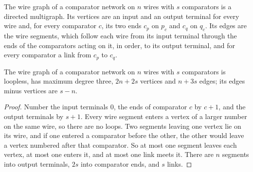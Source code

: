 \begin{definition}
  \label{def:lowerbounds-algebraic-halver-wire-graph}
  \leanok
  The wire graph of a comparator network on $n$ wires with $s$ comparators is a directed
  multigraph. Its vertices are an input and an output terminal for every wire and, for every
  comparator $c$, its two ends $c_p$ on $p_c$ and $c_q$ on $q_c$. Its edges are the wire
  segments, which follow each wire from its input terminal through the ends of the comparators
  acting on it, in order, to its output terminal, and for every comparator a link from $c_p$ to
  $c_q$.
\end{definition}

\begin{lemma}
  \label{lem:lowerbounds-algebraic-halver-wire-graph}
  \leanok
  The wire graph of a comparator network on $n$ wires with $s$ comparators is loopless, has
  maximum degree three, $2n+2s$ vertices and $n+3s$ edges; its edges minus vertices are $s-n$.
\end{lemma}
\begin{proof}
  \leanok
  Number the input terminals $0$, the ends of comparator $c$ by $c+1$, and the output terminals
  by $s+1$. Every wire segment enters a vertex of a larger number on the same wire, so there are
  no loops. Two segments leaving one vertex lie on its wire, and if one entered a comparator
  before the other, the other would leave a vertex numbered after that comparator. So at most
  one segment leaves each vertex, at most one enters it, and at most one link meets it.
  There are $n$ segments into output terminals, $2s$ into comparator ends, and $s$ links.
\end{proof}

